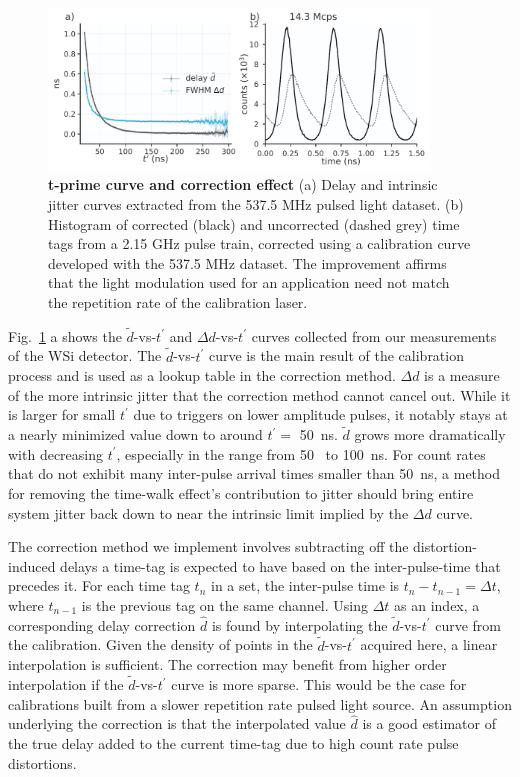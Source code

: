 \documentclass[11pt]{caltech_thesis} %
\begin{document}
\hypertarget{fig:jitterate_results_1}{%
\begin{figure}
\centering
\includegraphics[width=0.9\textwidth,height=\textheight]{./chapter_03/figs/jitterate_data_ab_light.pdf}
\caption[{t-prime curve and correction effect}]{\textbf{t-prime curve and correction effect} (a) Delay and intrinsic jitter curves extracted from the 537.5 MHz pulsed light dataset. (b) Histogram of corrected (black) and uncorrected (dashed grey) time tags from a 2.15 GHz pulse train, corrected using a calibration curve developed with the 537.5 MHz dataset. The improvement affirms that the light modulation used for an application need not match the repetition rate of the calibration laser.}
\label{fig:jitterate_results_1}
\end{figure}
}

Fig.~\ref{fig:jitterate_results_1} a shows the $\tilde{d}$-vs-$t^\prime$ and $\Delta d$-vs-$t^\prime$ curves collected from our measurements of the WSi detector. The $\tilde{d}$-vs-$t^\prime$ curve is the main result of the calibration process and is used as a lookup table in the correction method. $\Delta d$ is a measure of the more intrinsic jitter that the correction method cannot cancel out. While it is larger for small $t^\prime$ due to triggers on lower amplitude pulses, it notably stays at a nearly minimized value down to around $t^\prime =$ 50~ns. $\tilde{d}$ grows more dramatically with decreasing $t^\prime$, especially in the range from 50~ to 100~ns. For count rates that do not exhibit many inter-pulse arrival times smaller than 50~ns, a method for removing the time-walk effect's contribution to jitter should bring entire system jitter back down to near the intrinsic limit implied by the $\Delta d$ curve.

The correction method we implement involves subtracting off the distortion-induced delays a time-tag is expected to have based on the inter-pulse-time that precedes it. For each time tag $t_n$ in a set, the inter-pulse time is $t_n - t_{n-1} = \Delta t$, where $t_{n-1}$ is the previous tag on the same channel. Using $\Delta t$ as an index, a corresponding delay correction $\hat{d}$ is found by interpolating the $\tilde{d}$-vs-$t^\prime$ curve from the calibration. Given the density of points in the $\tilde{d}$-vs-$t^\prime$ acquired here, a linear interpolation is sufficient. The correction may benefit from higher order interpolation if the $\tilde{d}$-vs-$t^\prime$ curve is more sparse. This would be the case for calibrations built from a slower repetition rate pulsed light source. An assumption underlying the correction is that the interpolated value $\hat{d}$ is a good estimator of the true delay added to the current time-tag due to high count rate pulse distortions.
\end{document}
